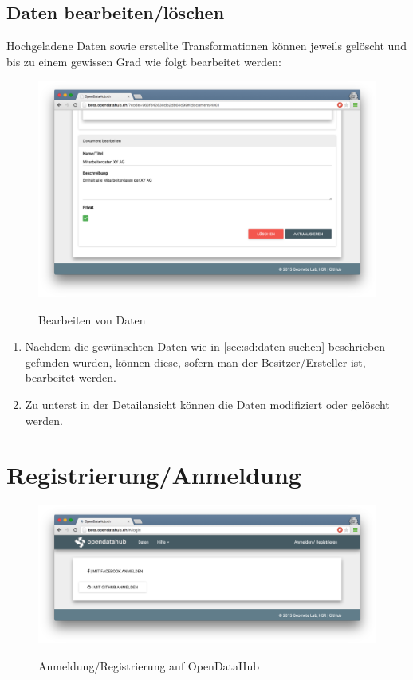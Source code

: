 \subsection{Daten bearbeiten/löschen}

Hochgeladene Daten sowie erstellte Transformationen können jeweils gelöscht und bis zu einem gewissen Grad wie folgt bearbeitet werden:

\begin{figure}[H]
	\centering
	\includegraphics[width=\linewidth]{fig/screenshot-daten-bearbeiten}
	\label{fig:sd:screenshot-daten-bearbeiten}
	\caption{Bearbeiten von Daten}
\end{figure}


\begin{enumerate}
\item Nachdem die gewünschten Daten wie in \cref{sec:sd:daten-suchen} beschrieben gefunden wurden, können diese, sofern man der Besitzer/Ersteller ist, bearbeitet werden.
\item Zu unterst in der Detailansicht können die Daten modifiziert oder gelöscht werden.
\end{enumerate}


\section{Registrierung/Anmeldung}
\label{sec:sd:anmeldung}

\begin{figure}[H]
	\centering
	\includegraphics[width=\linewidth]{fig/screenshot-anmelden}
	\label{fig:sd:screenshot-anmelden}
	\caption{Anmeldung/Registrierung auf OpenDataHub}
\end{figure}

